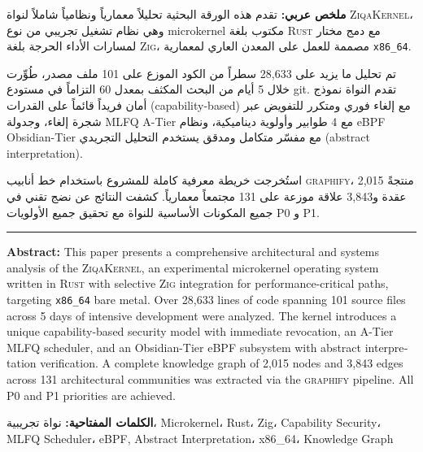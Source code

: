 \documentclass[12pt,a4paper]{article}
\theoremstyle{definition}
\newcommand{\en}[1]{\textenglish{#1}}
\begin{document}
\begin{tcolorbox}[enhanced, colback=accent!6, colframe=accent,
  arc=4pt, boxrule=1.2pt, left=10pt, right=10pt, top=8pt, bottom=8pt]

\textbf{\large ملخص عربي:}\quad
تقدم هذه الورقة البحثية تحليلاً معمارياً ونظامياً شاملاً لنواة
\textsc{ZiqaKernel}، وهي نظام تشغيل تجريبي من نوع
\en{microkernel} مكتوب بلغة \textsc{Rust} مع دمج مختار لمسارات الأداء الحرجة بلغة
\textsc{Zig}، مصممة للعمل على المعدن العاري لمعمارية \texttt{x86\_64}.

\medskip

تم تحليل ما يزيد على 28,633 سطراً من الكود الموزع على 101 ملف مصدر، طُوِّرت خلال 5 أيام من البحث المكثف بمعدل 60 التزاماً في مستودع git. تقدم النواة نموذج أمان فريداً قائماً على القدرات (\en{capability-based}) مع إلغاء فوري ومتكرر للتفويض عبر شجرة إلغاء، وجدولة \en{MLFQ} \en{A-Tier} مع 4 طوابير وأولوية ديناميكية، ونظام \en{eBPF Obsidian-Tier} مع مفسّر متكامل ومدقق يستخدم التحليل التجريدي (\en{abstract interpretation}).

\medskip

استُخرجت خريطة معرفية كاملة للمشروع باستخدام خط أنابيب \textsc{graphify}، منتجةً 2,015 عقدة و3,843 علاقة موزعة على 131 مجتمعاً معمارياً. كشفت النتائج عن نضج تقني في جميع المكونات الأساسية للنواة مع تحقيق جميع الأولويات P0 و P1.

\bigskip\hrule\bigskip

\textbf{\large Abstract:}\quad
This paper presents a comprehensive architectural and systems analysis of the
\textsc{ZiqaKernel}, an experimental \en{microkernel} operating system written in
\textsc{Rust} with selective \textsc{Zig} integration for performance-critical
paths, targeting \texttt{x86\_64} bare metal. Over 28{,}633 lines of code
spanning 101 source files across 5 days of intensive development were analyzed.
The kernel introduces a unique \en{capability-based} security model with immediate
revocation, an \en{A-Tier} \en{MLFQ} \en{scheduler}, and an \en{Obsidian-Tier} eBPF subsystem with
\en{abstract interpretation} verification. A complete knowledge graph of 2{,}015
nodes and 3{,}843 edges across 131 architectural communities was extracted via
the \textsc{graphify} pipeline. All P0 and P1 priorities are achieved.
\end{tcolorbox}

\vspace{0.5cm}

\noindent\textbf{الكلمات المفتاحية:}
نواة تجريبية، \en{Microkernel}، Rust، Zig، Capability Security،
\en{MLFQ} \en{Scheduler}، eBPF, \en{Abstract Interpretation}، x86\_64، Knowledge Graph
\end{document}
